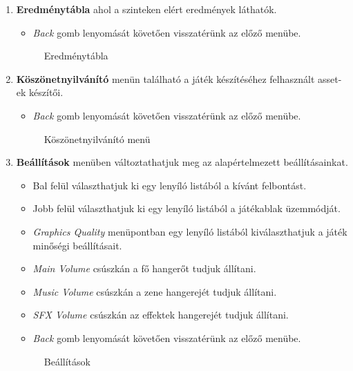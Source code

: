 \begin{enumerate}
	\item \label{scoreboard} \textbf{Eredménytábla} ahol a szinteken elért eredmények láthatók.
	\begin{itemize}
		\item \textit{Back} gomb lenyomását követően visszatérünk az előző menübe.
	\end{itemize}
	\begin{figure}[H]
		\noindent{}
		\caption{Eredménytábla}
		\label{scoreBoardF}
	\end{figure}
	
	\item \label{credit} \textbf{Köszönetnyilvánító} menün található a játék készítéséhez felhasznált asset-ek készítői.
	\begin{itemize}
		\item \textit{Back} gomb lenyomását követően visszatérünk az előző menübe.
	\end{itemize}
	\begin{figure}[H]
		\noindent{}
		\caption{Köszönetnyilvánító menü}
		\label{creditF}
	\end{figure}
	
	\item \label{setting} \textbf{Beállítások} menüben változtathatjuk meg az alapértelmezett beállításainkat.
	\begin{itemize}
		\item Bal felül választhatjuk ki egy lenyíló listából a kívánt felbontást.
		\item Jobb felül választhatjuk ki egy lenyíló listából a játékablak üzemmódját.
		\item \textit{Graphics Quality} menüpontban egy lenyíló listából kiválaszthatjuk a játék minőségi beállításait.
		\item \textit{Main Volume} csúszkán a fő hangerőt tudjuk állítani.
		\item \textit{Music Volume} csúszkán a zene hangerejét tudjuk állítani.
		\item \textit{SFX Volume} csúszkán az effektek hangerejét tudjuk állítani.
		\item \textit{Back} gomb lenyomását követően visszatérünk az előző menübe.
	\end{itemize}
	\begin{figure}[H]
		\noindent{}
		\caption{Beállítások}
		\label{settings}
	\end{figure}
	

\end{enumerate}
